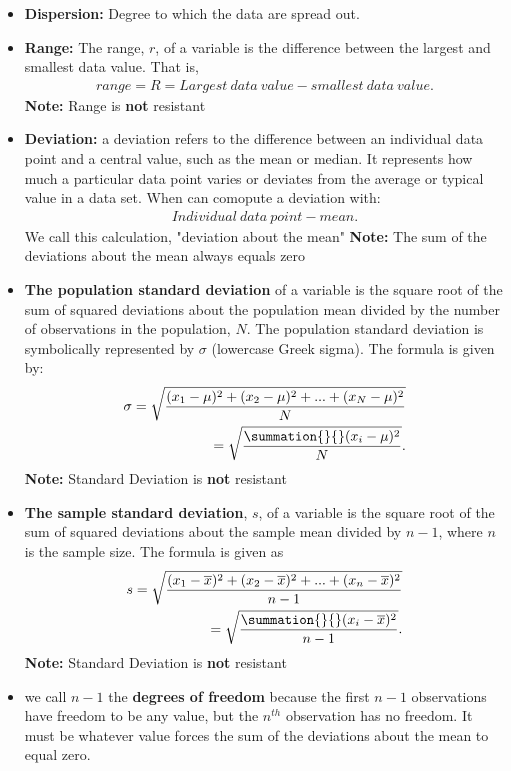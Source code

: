 \documentclass{report}
\begin{document}
        \begin{itemize}
            \item \textbf{Dispersion:} Degree to which the data are spread out. 
            \item \textbf{Range:} The range, $r $, of a variable is the difference between the largest and smallest data value. That is,
                \begin{align*}
                    range = R = Largest\ data\ value- smallest\ data\ value
                .\end{align*}
                \textbf{Note:} Range is \textbf{not} resistant
            \item \textbf{Deviation:} a deviation refers to the difference between an individual data point and a central value, such as the mean or median. It represents how much a particular data point varies or deviates from the average or typical value in a data set. When can comopute a deviation with:
                \begin{align*}
                    Individual\ data\ point - mean
                .\end{align*}
                We call this calculation, "deviation about the mean"
                \bigbreak \noindent 
                \textbf{Note:} The sum of the deviations about the mean always equals zero
            \item \textbf{The population standard deviation} of a variable is the square root of the sum of squared deviations about the population mean divided by the number of observations in the population, $N$. The population standard deviation is symbolically represented by $\sigma$ (lowercase Greek sigma). The formula is given by:
                \begin{align*}
                    \sigma = \sqrt{\frac{(x_{1} - \mu)^{2} + (x_{2}-\mu)^{2}+...+(x_{N}-\mu)^{2}}{N}} \\
                    = \sqrt{\frac{\summation{}{}(x_{i}-\mu)^{2} }{N}}
                .\end{align*}
                \textbf{Note:} Standard Deviation is \textbf{not} resistant
            \item \textbf{The sample standard deviation}, $s $, of a variable is the square root of the sum of squared deviations about the sample mean divided by $n-1 $, where $n$  is the sample size. The formula is given as
                \begin{align*}
                    s = \sqrt{\frac{(x_{1} - \overline{x})^{2}+(x_{2}-\overline{x})^{2}+...+(x_{n}-\overline{x})^{2}}{n-1}}\\
                    = \sqrt{\frac{\summation{}{}(x_{i}-\overline{x})^{2}}{n-1}}
                .\end{align*}
                \textbf{Note:} Standard Deviation is \textbf{not} resistant
            \item  we call $n-1$ the \textbf{degrees of freedom} because the first $n-1 $  observations have freedom to be any value, but the $n^{th}$ observation has no freedom. It must be whatever value forces the sum of the deviations about the mean to equal zero.

        \end{itemize}
\end{document}
